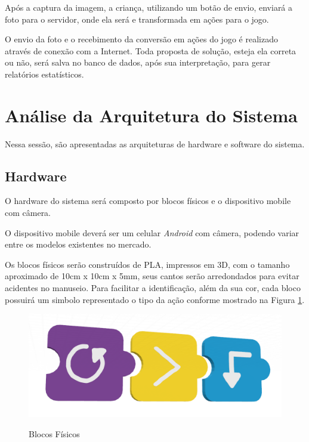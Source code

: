     Após a captura da imagem, a criança, utilizando um botão de envio, enviará a foto para o servidor, onde ela será e transformada em ações para o jogo.
    
    O envio da foto e o recebimento da conversão em ações do jogo é realizado através de conexão com a Internet.
    Toda proposta de solução, esteja ela correta ou não, será salva no banco de dados, após sua interpretação, para gerar relatórios estatísticos.


\section{Análise da Arquitetura do Sistema}
    Nessa sessão, são apresentadas as arquiteturas de hardware e software do sistema.

    \subsection{Hardware}
    O hardware do sistema será composto por blocos físicos e o dispositivo mobile com câmera.
    
    O dispositivo mobile deverá ser um celular \textit{Android} com câmera, podendo variar entre os modelos existentes no mercado.
    
    Os blocos físicos serão construídos de PLA, impressos em 3D, com o tamanho aproximado de 10cm x 10cm x 5mm, seus cantos serão arredondados para evitar acidentes no manuseio. Para facilitar a identificação, além da sua cor, cada bloco possuirá um simbolo representado o tipo da ação conforme mostrado na Figura \ref{figura:blocos_fisicos}.
    
    \begin{figure}[H]
        \caption{Blocos Físicos}
        \centering
        \includegraphics[width=\linewidth]{Imagens/cap3/Blocos.png}
        \label{figura:blocos_fisicos}
    \end{figure}
    
